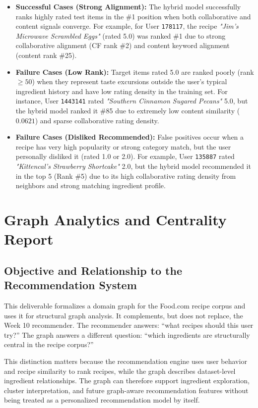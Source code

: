 \documentclass[11pt,a4paper]{article}
\begin{document}
\begin{itemize}
    \item \textbf{Successful Cases (Strong Alignment):} The hybrid model successfully ranks highly rated test items in the \#1 position when both collaborative and content signals converge. For example, for User \texttt{178117}, the recipe \textit{"Jim's Microwave Scrambled Eggs"} (rated 5.0) was ranked \#1 due to strong collaborative alignment (CF rank \#2) and content keyword alignment (content rank \#25).
    
    \item \textbf{Failure Cases (Low Rank):} Target items rated 5.0 are ranked poorly (rank $\ge 50$) when they represent taste excursions outside the user's typical ingredient history and have low rating density in the training set. For instance, User \texttt{1443141} rated \textit{"Southern Cinnamon Sugared Pecans"} 5.0, but the hybrid model ranked it \#85 due to extremely low content similarity ($0.0621$) and sparse collaborative rating density.
    
    \item \textbf{Failure Cases (Disliked Recommended):} False positives occur when a recipe has very high popularity or strong category match, but the user personally disliked it (rated 1.0 or 2.0). For example, User \texttt{135887} rated \textit{"Kittencal's Strawberry Shortcake"} 2.0, but the hybrid model recommended it in the top 5 (Rank \#5) due to its high collaborative rating density from neighbors and strong matching ingredient profile.
\end{itemize}

\section{Graph Analytics and Centrality Report}

\subsection{Objective and Relationship to the Recommendation System}
This deliverable formalizes a domain graph for the Food.com recipe corpus and uses it for structural graph analysis. It complements, but does not replace, the Week 10 recommender. The recommender answers: ``what recipes should this user try?'' The graph answers a different question: ``which ingredients are structurally central in the recipe corpus?''

This distinction matters because the recommendation engine uses user behavior and recipe similarity to rank recipes, while the graph describes dataset-level ingredient relationships. The graph can therefore support ingredient exploration, cluster interpretation, and future graph-aware recommendation features without being treated as a personalized recommendation model by itself.
\end{document}
